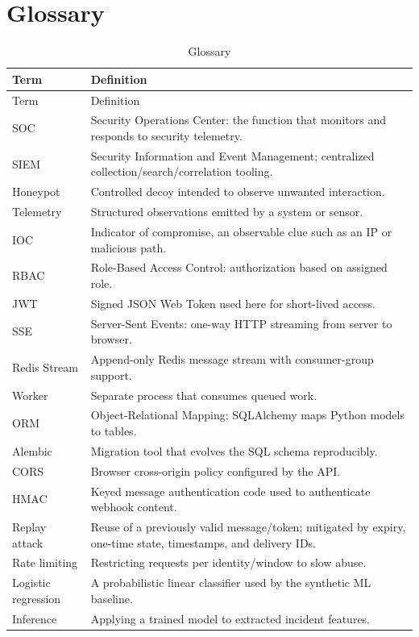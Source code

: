 \documentclass[11pt,oneside]{book}
\begin{document}
\chapter{Glossary}
\begin{longtable}{p{36mm}p{110mm}}\caption{Glossary}\\\toprule Term & Definition\\\midrule\endfirsthead\toprule Term & Definition\\\midrule\endhead
SOC & Security Operations Center: the function that monitors and responds to security telemetry.\\
SIEM & Security Information and Event Management; centralized collection/search/correlation tooling.\\
Honeypot & Controlled decoy intended to observe unwanted interaction.\\
Telemetry & Structured observations emitted by a system or sensor.\\
IOC & Indicator of compromise, an observable clue such as an IP or malicious path.\\
RBAC & Role-Based Access Control: authorization based on assigned role.\\
JWT & Signed JSON Web Token used here for short-lived access.\\
SSE & Server-Sent Events: one-way HTTP streaming from server to browser.\\
Redis Stream & Append-only Redis message stream with consumer-group support.\\
Worker & Separate process that consumes queued work.\\
ORM & Object-Relational Mapping; SQLAlchemy maps Python models to tables.\\
Alembic & Migration tool that evolves the SQL schema reproducibly.\\
CORS & Browser cross-origin policy configured by the API.\\
HMAC & Keyed message authentication code used to authenticate webhook content.\\
Replay attack & Reuse of a previously valid message/token; mitigated by expiry, one-time state, timestamps, and delivery IDs.\\
Rate limiting & Restricting requests per identity/window to slow abuse.\\
Logistic regression & A probabilistic linear classifier used by the synthetic ML baseline.\\
Inference & Applying a trained model to extracted incident features.\\\bottomrule\end{longtable}
\end{document}
